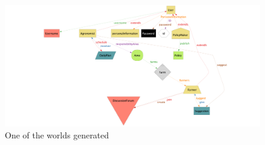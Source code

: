 \documentclass[../../main.tex]{subfiles}
\begin{document}
\begin{figure}[H]
  \centering
  \includegraphics[width=\textwidth]{RASD/image/Alloy3.png}
  \caption{One of the worlds generated}
\end{figure}
\end{document}
